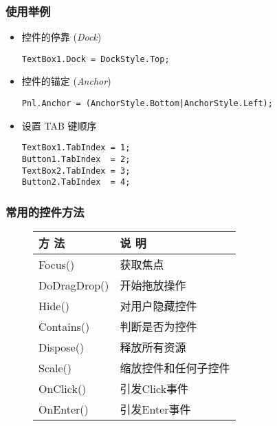 \begin{frame}[fragile]
\frametitle{使用举例}
\begin{itemize}
\item 控件的停靠 (\textit{Dock})
\begin{lstlisting}
TextBox1.Dock = DockStyle.Top;
\end{lstlisting}
\item 控件的锚定 (\textit{Anchor})
\begin{lstlisting}
Pnl.Anchor = (AnchorStyle.Bottom|AnchorStyle.Left);
\end{lstlisting}
\item 设置 TAB 键顺序
\begin{lstlisting}
TextBox1.TabIndex = 1;
Button1.TabIndex  = 2;
TextBox2.TabIndex = 3;
Button2.TabIndex  = 4;
\end{lstlisting}
\end{itemize}
\end{frame}

\begin{frame}
\frametitle{常用的控件方法}
\begin{figure}
  \centering
  \begin{tabular}{l|l}
    \hline
    方 法        & 说 明                \\
    \hline
    Focus()      & 获取焦点             \\
    DoDragDrop() & 开始拖放操作         \\
    Hide()       & 对用户隐藏控件       \\
    \hline
    Contains()   & 判断是否为控件       \\
    Dispose()    & 释放所有资源         \\
    Scale()      & 缩放控件和任何子控件 \\
    \hline
    OnClick()    & 引发Click事件       \\
    OnEnter()    & 引发Enter事件       \\
    \hline
  \end{tabular}
\end{figure}
\end{frame}

